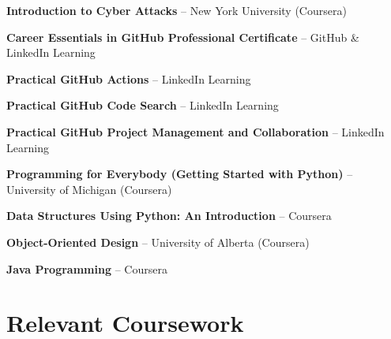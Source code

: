 \documentclass[a4paper,11pt]{article}
\begin{document}
\begin{itemize}[leftmargin=0in, label={}]

\small{

\item{
\textbf{Introduction to Cyber Attacks} -- New York University (Coursera)
}

\item{
\textbf{Career Essentials in GitHub Professional Certificate} -- GitHub \& LinkedIn Learning
}

\item{
\textbf{Practical GitHub Actions} -- LinkedIn Learning
}

\item{
\textbf{Practical GitHub Code Search} -- LinkedIn Learning
}

\item{
\textbf{Practical GitHub Project Management and Collaboration} -- LinkedIn Learning
}

\item{
\textbf{Programming for Everybody (Getting Started with Python)} -- University of Michigan (Coursera)
}

\item{
\textbf{Data Structures Using Python: An Introduction} -- Coursera
}

\item{
\textbf{Object-Oriented Design} -- University of Alberta (Coursera)
}

\item{
\textbf{Java Programming} -- Coursera
}

}

\end{itemize}

\vspace{-10pt}



\section{Relevant Coursework}
\end{document}
